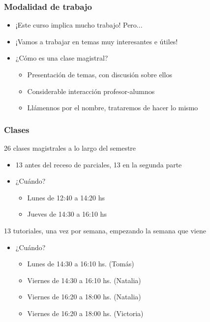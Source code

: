 \documentclass[14pt]{beamer}
\begin{document}
\begin{frame}
\frametitle{Modalidad de trabajo}
\begin{itemize}
    \item ¡Este curso implica mucho trabajo! Pero...  \vspace{2mm}
    \item ¡Vamos a trabajar en temas muy interesantes e útiles!  \vspace{2mm}
    \item ¿Cómo es una clase magistral? 
        \begin{itemize}
            \item Presentación de temas, con discusión sobre ellos
            \item Considerable interacción profesor-alumnos
            \item Llámennos por el nombre, trataremos de hacer lo mismo
        \end{itemize}
\end{itemize}
\end{frame}

\begin{frame}
\frametitle{Clases}
26 clases magistrales a lo largo del semestre 
\begin{itemize}
        \item 13 antes del receso de parciales, 13 en la segunda parte
        \item ¿Cuándo?
            \begin{itemize}
            \item Lunes de 12:40 a 14:20 hs
            \item Jueves de 14:30 a 16:10 hs
            \end{itemize}
\end{itemize}
13 tutoriales, una vez por semana, empezando la semana que viene 
\begin{itemize}
 \item ¿Cuándo?
        \begin{itemize}
            \item Lunes de 14:30 a 16:10 hs. (Tomás)
            \item Viernes de 14:30 a 16:10 hs. (Natalia)
            \item Viernes de 16:20 a 18:00 hs. (Natalia)
            \item Viernes de 16:20 a 18:00 hs. (Victoria)
        \end{itemize}
\end{itemize}
\end{frame}
\end{document}
